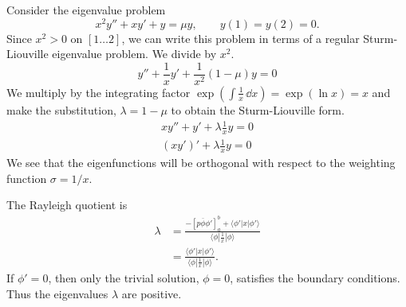 












\begin{Example}
  Consider the eigenvalue problem
  \[ 
  x^2 y'' + x y' + y = \mu y, \qquad y(1) = y(2) = 0.
  \]
  Since $x^2 > 0$ on $[1 \ldots 2]$, we can write this problem in terms of a
  regular Sturm-Liouville eigenvalue problem.  We divide by $x^2$.
  \[ 
  y'' + \frac{1}{x} y' + \frac{1}{x^2} (1 - \mu) y = 0
  \]
  We multiply by the integrating factor 
  $\exp(\int \frac{1}{x}\,\dd x) = \exp(\ln x) = x$
  and make the substitution, $\lambda = 1 - \mu$ to obtain the 
  Sturm-Liouville form.
  \begin{gather*}
    x y'' + y' + \lambda \frac{1}{x} y = 0 
    \\
    (x y')' + \lambda \frac{1}{x} y = 0
  \end{gather*}
  We see that the eigenfunctions will be orthogonal with respect to the 
  weighting function $\sigma = 1/x$.

  The Rayleigh quotient is 
  \begin{align*}
    \lambda 
    &= \frac{-\left[p \overline{\phi} \phi'\right]_a^b +\langle \phi' | x | \phi'\rangle}
    {\langle \phi | \frac{1}{x} | \phi \rangle } 
    \\
    &= \frac{\langle \phi' | x | \phi'\rangle} {\langle \phi | \frac{1}{x} | \phi \rangle }.
  \end{align*}
  If $\phi' = 0$, then only the trivial solution, $\phi = 0$, satisfies the 
  boundary conditions.  Thus the eigenvalues $\lambda$ are positive.


\end{Example}
